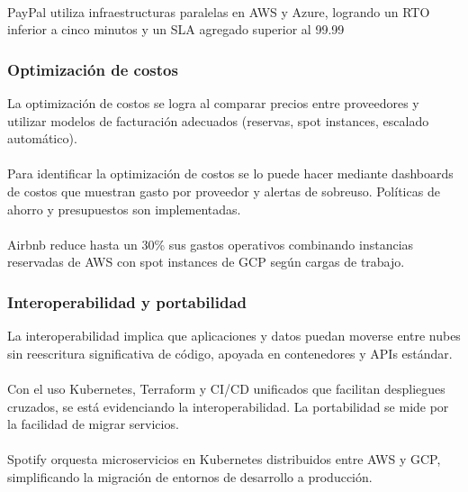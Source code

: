 {                \paragraph{}PayPal utiliza infraestructuras paralelas en AWS y Azure, logrando un RTO inferior a cinco minutos y un SLA agregado superior al 99.99%
            
            \subsubsection{Optimización de costos}
                La optimización de costos se logra al comparar precios entre proveedores y utilizar modelos de facturación adecuados (reservas, spot instances, escalado automático).
                
                \paragraph{}Para identificar la optimización de costos se lo puede hacer mediante dashboards de costos que muestran gasto por proveedor y alertas de sobreuso. Políticas de ahorro y presupuestos son implementadas.
            
                \paragraph{}Airbnb reduce hasta un 30\% sus gastos operativos combinando instancias reservadas de AWS con spot instances de GCP según cargas de trabajo.
            
            \subsubsection{Interoperabilidad y portabilidad}
                La interoperabilidad implica que aplicaciones y datos puedan moverse entre nubes sin reescritura significativa de código, apoyada en contenedores y APIs estándar.
            
                \paragraph{}Con el uso Kubernetes, Terraform y CI/CD unificados que facilitan despliegues cruzados, se está evidenciando la interoperabilidad. La portabilidad se mide por la facilidad de migrar servicios.
            
                \paragraph{}Spotify orquesta microservicios en Kubernetes distribuidos entre AWS y GCP, simplificando la migración de entornos de desarrollo a producción.
            
}
